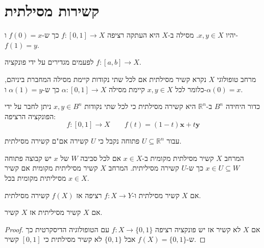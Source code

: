 \documentclass{tstextbook}
\begin{document}
\section{קשירות מסילתית}

\begin{definition}[מסילה]
יהיו \(x,y\in X\). מסילה ב-\(X\) היא העתקה רציפה \(f:[0,1]\to X\) כך ש-\(f(0)=x\) ו-\(f(1)=y\).

\end{definition}
\begin{remark}
לפעמים מגדירים על ידי פונקציה \(f:[a,b]\to X\).

\end{remark}
\begin{definition}
מרחב טופולוגי \(X\) נקרא קשיר מסילתית אם לכל שתי נקודות קיימת מסילה המחברת ביניהם, כלומר לכל \(x,y \in X\) קיימת מסילה \(\alpha:[0,1]\to X\) כך ש-\(\alpha(1)=y\) ו-\(\alpha(0)=x\).

\end{definition}
\begin{example}
כדור היחידה \(B^{n}\) ב-\(\mathbb{R}^{n}\) היא קשירה מסילתית כי לכל שתי נקודות \(x,y \in B^{n}\) ניתן לחבר על ידי הפונקציה הרציפה:
$$f:[0,1]\to X\qquad f(t)=(1-t)\mathbf{x}+t\mathbf{y}$$

\end{example}
\begin{proposition}
עבור \(U\subseteq \mathbb{R}^{n}\) פתוחה נקבל כי \(U\) קשירה אם"ם קשירה מסילתית.

\end{proposition}
\begin{definition}
המרחב \(X\) קשיר מסילתית מקומית ב-\(x \in X\) אם לכל סביבה \(W\) של \(x\) יש קבוצה פתוחה \(x \in U\subseteq W\) כך ש-\(U\) קשירה מסיליתית. המרחב \(X\) קשיר מסיליתית מקומית אם קשיר מסיליתית מקומית בכל \(x \in X\).

\end{definition}
\begin{proposition}
אם \(X\) קשיר מסילתית ו-\(f:X\to Y\) רציפה אז \(f(X)\) קשירה מסילתית.

\end{proposition}
\begin{proposition}
אם \(X\) קשיר מסיליתית אז \(X\) קשיר.

\end{proposition}
\begin{proof}
אם \(X\) לא קשיר אז יש פונקציה רציפה \(f:X\to \{ 0,1 \}\) עם הטופולוגיה הדיסקרטית כך ש-\(f(X)=\{ 0,1 \}\) אבל \(\{ 0,1 \}\) לא קשיר מסילתית כי \([0,1]\) קשיר.

\end{proof}
\end{document}
